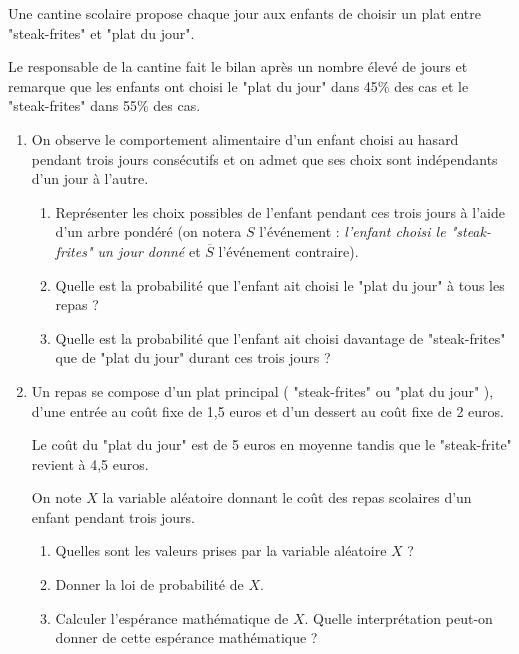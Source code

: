 
%
Une cantine scolaire propose chaque jour aux enfants de choisir un plat entre "steak-frites" et "plat du jour".
\par
Le responsable de la cantine fait le bilan après un nombre élevé de jours et remarque que les enfants ont choisi le "plat du jour" dans 45\% des cas et le "steak-frites" dans 55\% des cas.
\begin{enumerate}
     \item
     On observe le comportement alimentaire d'un enfant choisi au hasard pendant trois jours consécutifs et on admet que ses choix sont indépendants d'un jour à l'autre.
     \begin{enumerate}[label=\alph*.]
          \item
          Représenter les choix possibles de l'enfant pendant ces trois jours à l'aide d'un arbre pondéré (on notera $S$ l'événement : \textit{l'enfant choisi le "steak-frites" un jour donné} et $ \overline{S} $ l'événement contraire).
          \item
          Quelle est la probabilité que l'enfant ait choisi le "plat du jour" à tous les repas ?
          \item
          Quelle est la probabilité que l'enfant ait choisi davantage de "steak-frites" que de "plat du jour" durant ces trois jours ?
     \end{enumerate}
     \item
     Un repas se compose d'un plat principal ( "steak-frites" ou "plat du jour" ), d'une entrée au coût fixe de 1,5 euros et d'un dessert au coût fixe de 2 euros.
     \par
     Le coût du "plat du jour" est de 5 euros en moyenne tandis que le "steak-frite" revient à 4,5 euros.
     \par
     On note $X$ la variable aléatoire donnant le coût des repas scolaires d'un enfant pendant trois jours.
     \begin{enumerate}[label=\alph*.]
          \item
          Quelles sont les valeurs prises par la variable aléatoire $X$ ?
          \item
          Donner la loi de probabilité de $X$.
          \item
          Calculer l'espérance mathématique de $X$. Quelle interprétation peut-on donner de cette espérance mathématique ?
     \end{enumerate}
\end{enumerate}
